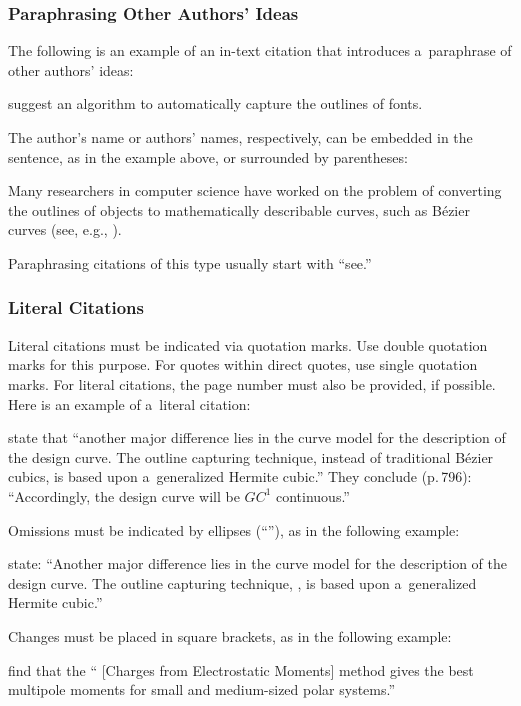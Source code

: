 \documentclass[11pt, a4paper, oneside]{article}
\renewcommand{\caps}[1]{{\textscale{0.97}{\textls[50]{\MakeUppercase{#1}}}}}
\theoremstyle{Plain}
\theoremstyle{Definition}
\theoremstyle{Remark}
\let \citeOrig \cite
\let \cite \textcite
\let \citealp \citeOrig
\begin{document}
\subsubsection{Paraphrasing Other Authors' Ideas}

The following is an example of an in-text citation that introduces a~paraphrase of other authors' ideas:
\begin{longtblr}{}
	\cite{sarfraz} suggest an algorithm to automatically capture the outlines of fonts.
\end{longtblr}
\noindent The author's name or authors' names, respectively, can be embedded in the sentence, as in the example above, or surrounded by parentheses:
\begin{longtblr}{}
	Many researchers in computer science have worked on the problem of converting the outlines of objects to mathematically describable curves, such as B\'{e}zier curves (see, e.g., \citealp{sarfraz}).
\end{longtblr}
\noindent Paraphrasing citations of this type usually start with ``see.''

\subsubsection{Literal Citations}

Literal citations must be indicated via quotation marks. Use double quotation marks for this purpose. For quotes within direct quotes, use single quotation marks. For literal citations, the page number must also be provided, if possible. Here is an example of a~literal citation:
\begin{longtblr}{}
	\cite[795]{sarfraz} state that ``another major difference lies in the curve model for the description of the design curve. The outline capturing technique, instead of traditional B\'{e}zier cubics, is based upon a~generalized Hermite cubic.'' They conclude (p.\,796): ``Accordingly, the design curve will be $GC^1$ continuous.''
\end{longtblr}

Omissions must be indicated by ellipses (``\textellipsis\!''), as in the following example:
\begin{longtblr}{}
	\cite[795]{sarfraz} state: ``Another major difference lies in the curve model for the description of the design curve. The outline capturing technique, \textellipsis, is based upon a~generalized Hermite cubic.''
\end{longtblr}

Changes must be placed in square brackets, as in the following example:
\begin{longtblr}{}
	\cite[377]{sigfridsson} find that the ``\caps{CHELMO} [Charges from Electrostatic Moments] method gives the best multipole moments for small and medium-sized polar systems.''
\end{longtblr}
\end{document}
